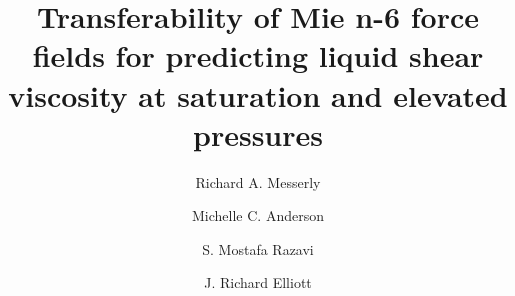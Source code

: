 \documentclass[preprint,review,12pt]{elsarticle}
\begin{document}
	
\begin{frontmatter}
		
		
		
		\title{}
		
		\title{Transferability of Mie n-6 force fields for predicting liquid shear viscosity at saturation and elevated pressures}
		
		
		\author{Richard A. Messerly}
		\address{Thermodynamics Research Center, National Institute of Standards and Technology, Boulder, Colorado, 80305}
		
		\author{Michelle C. Anderson}
		
		\author{S. Mostafa Razavi}
		
		\author{J. Richard Elliott}
		
%		
%
%	
%	
%	
	

\end{frontmatter}
\end{document}

